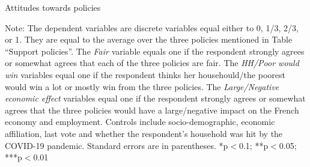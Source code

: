 \begin{framefont}{\small}
\begin{frame}{}%
\begin{table}[h!]
\caption{Attitudes towards policies}
\begin{center}
\scalebox{.7}{}
\end{center}
	{\scriptsize Note: The dependent variables are discrete variables equal either to 0, 1/3, 2/3, or 1. They are equal to the average over the three policies mentioned in Table ``Support policies''. The \textit{Fair} variable equals one if the respondent strongly agrees or somewhat agrees that each of the three policies are fair. The \textit{HH/Poor would win} variables equal one if the respondent thinks her househould/the poorest would win a lot or mostly win from the three policies. The \textit{Large/Negative economic effect} variables equal one if the respondent strongly agrees or somewhat agrees that the three policies would have a large/negative impact on the French economy and employment. 
	\newline Controls include socio-demographic, economic affiliation, last vote and whether the respondent's household was hit by the COVID-19 pandemic. Standard errors are in parentheses. *p$<$0.1; **p$<$0.05; ***p$<$0.01}
\end{table}
\end{frame}



\end{framefont}
